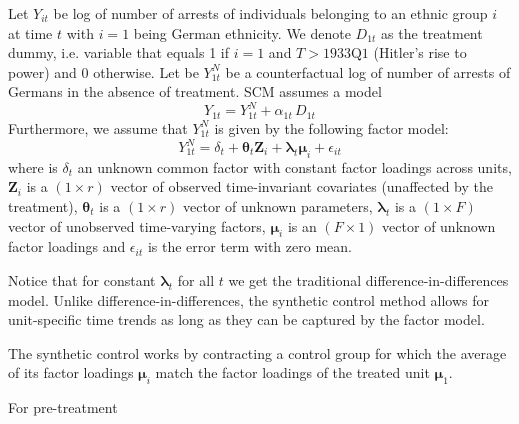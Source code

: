 Let $Y_{it}$ be log of number of arrests of individuals belonging to an ethnic group $i$ at time $t$ with $i = 1$ being German ethnicity.  We
denote $D_{1t}$ as the treatment dummy, i.e. variable that equals 1 if $i = 1$ and $T > \text{1933Q1}$ (Hitler's rise to power) and 0 otherwise. 
Let be $Y_{1t}^N$ be a counterfactual log of number of arrests of Germans in the absence of treatment. SCM assumes a model
\begin{equation}
    Y_{1t} = Y_{1t}^N + \alpha_{1t} \, D_{1t}
\end{equation}
Furthermore, we assume that $Y_{1t}^N$ is given by the following factor model:
\begin{equation}
   Y_{1t}^N = \delta_t + \boldsymbol{\theta}_t \boldsymbol{Z}_i +
   \boldsymbol{\lambda}_t \boldsymbol{\mu}_i + \epsilon_{it}
\end{equation}
where is $\delta_t$ an unknown common factor with constant factor
loadings across units, $\boldsymbol{Z}_i$ is a
$(1 \times r)$ vector of observed time-invariant covariates (unaffected by the treatment),  $\boldsymbol{\theta}_t$ is a $(1 \times r)$ vector of
unknown parameters, $\boldsymbol{\lambda}_t$ is a $(1 \times F)$ vector of unobserved time-varying factors, $\boldsymbol{\mu}_i$ is an $(F \times 1)$ vector of unknown factor loadings
and $\epsilon_{it}$ is the error term with zero mean. 

Notice that for constant  $\boldsymbol{\lambda}_t$ for all $t$ we get the traditional  difference-in-differences model. Unlike difference-in-differences,  the synthetic control method  allows for unit-specific time trends as long as they can be captured by the factor model. 

The synthetic control works by contracting a control group for which the average of its factor loadings $\boldsymbol{\mu}_i$ match the factor loadings of the treated unit  $\boldsymbol{\mu}_1$.

For pre-treatment

